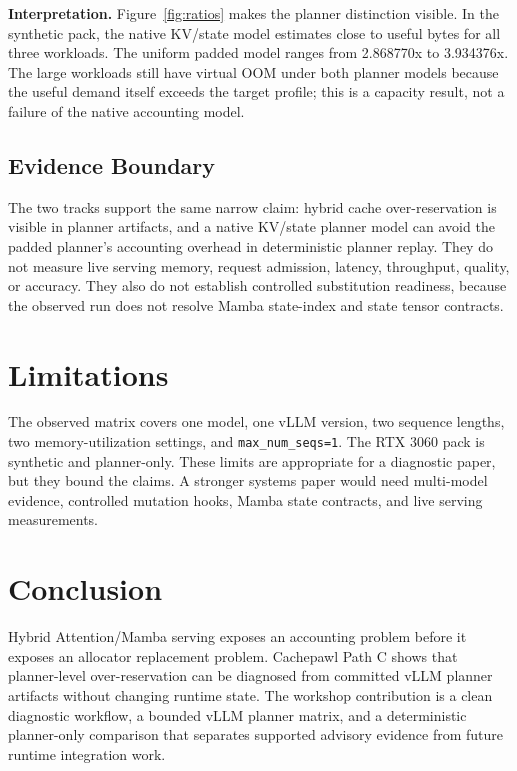 \documentclass[10pt,twocolumn]{article}
\newcommand{\tool}{Cachepawl}
\newcommand{\pathc}{Path C}
\newcommand{\plannerpad}{uniform padded}
\newcommand{\plannernative}{native KV/state}
\begin{document}
\textbf{Interpretation.}
Figure~\ref{fig:ratios} makes the planner distinction visible. In the synthetic
pack, the \plannernative{} model estimates close to useful bytes for all three
workloads. The \plannerpad{} model ranges from 2.868770x to 3.934376x. The
large workloads still have virtual OOM under both planner models because the
useful demand itself exceeds the target profile; this is a capacity result, not
a failure of the native accounting model.

\subsection{Evidence Boundary}

The two tracks support the same narrow claim: hybrid cache over-reservation is
visible in planner artifacts, and a native KV/state planner model can avoid
the padded planner's accounting overhead in deterministic planner replay. They
do not measure live serving memory, request admission, latency, throughput,
quality, or accuracy. They also do not establish controlled substitution
readiness, because the observed run does not resolve Mamba state-index and
state tensor contracts.

\section{Limitations}

The observed matrix covers one model, one vLLM version, two sequence lengths,
two memory-utilization settings, and \texttt{max\_num\_seqs=1}. The RTX 3060
pack is synthetic and planner-only. These limits are appropriate for a
diagnostic paper, but they bound the claims. A stronger systems paper would
need multi-model evidence, controlled mutation hooks, Mamba state contracts,
and live serving measurements.

\section{Conclusion}

Hybrid Attention/Mamba serving exposes an accounting problem before it exposes
an allocator replacement problem. \tool{} \pathc{} shows that planner-level
over-reservation can be diagnosed from committed vLLM planner artifacts without
changing runtime state. The workshop contribution is a clean diagnostic
workflow, a bounded vLLM planner matrix, and a deterministic planner-only
comparison that separates supported advisory evidence from future runtime
integration work.



\end{document}
